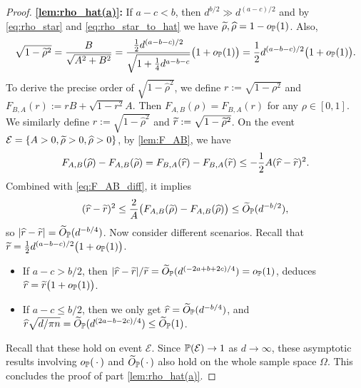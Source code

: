 \begin{proof}
\vspace{0.5\baselineskip}
\noindent
\textbf{\ref{lem:rho_hat(a)}:}
If $a - c < b$, then $d^{b/2} \gg d^{(a-c)/2}$ and by \cref{eq:rho_star} and \eqref{eq:rho_star_to_hat} we have $\wt\rho, \hat\rho = 1 - o_\P(1)$. Also,
\begin{equation*}
    \sqrt{1 - \wt\rho^2} = \frac{B}{\sqrt{A^2 + B^2}}
    = \frac{\frac12 d^{(a-b-c)/2}}{\sqrt{ 1 + \frac14 d^{a-b-c} }}\bigl(1 + o_{\P}(1)\bigr)
    = \frac12 d^{(a-b-c)/2}\bigl(1 + o_{\P}(1)\bigr).
\end{equation*}
To derive the precise order of $\sqrt{1 - \hat\rho^2}$, we define $r := \sqrt{1 - \rho^2}$ and $F_{B,A}(r) := rB + \sqrt{1 - r^2}A$. Then $F_{A,B}(\rho) = F_{B,A}(r)$ for any $\rho \in [0, 1]$. We similarly define $\hat r := \sqrt{1 - \hat\rho^2}$ and $\wt r := \sqrt{1 - \wt\rho^2}$. On the event $\mathcal{E} = \{ A > 0, \wt\rho >0, \hat\rho > 0 \}$, by \cref{lem:F_AB}, we have
\begin{equation*}
    F_{A,B}(\hat\rho) - F_{A,B}(\wt\rho) 
    = F_{B,A}(\hat r) - F_{B,A}(\wt r) 
    \le -\frac12 A (\hat r - \wt r)^2.
\end{equation*}
Combined with \cref{eq:F_AB_diff}, it implies
\begin{equation*}
    (\hat r - \wt r)^2 \le  \frac{2}{A}\bigl( F_{A,B}(\wt\rho) - F_{A,B}(\hat\rho) \bigr) \le \wt O_\P(d^{-b/2}),
\end{equation*}
so $|\hat r - \wt r| = \wt O_\P(d^{-b/4})$. Now consider different scenarios. Recall that $\wt r = \frac12 d^{(a-b-c)/2}\bigl(1 + o_{\P}(1)\bigr)$.
\begin{itemize}
    \item If $a - c > b/2$, then $|\hat r - \wt r|/\wt r = \wt O_\P(d^{(-2a + b + 2c)/4}) = o_\P(1)$, deduces $\hat r = \wt r \bigl(1 + o_{\P}(1)\bigr)$.
    \item If $a - c \le b/2$, then we only get $\hat r = \wt O_\P(d^{-b/4})$, and $\hat r \sqrt{d/\pi n} = \wt O_\P(d^{(2a - b-2c)/4})  \le \wt O_\P(1)$.
\end{itemize}
Recall that these hold on event $\mathcal{E}$. Since $\P(\mathcal{E}) \to 1$ as $d \to \infty$, these asymptotic results involving $o_\P(\,\cdot\,)$ and $\wt O_\P(\,\cdot\,)$ also hold on the whole sample space $\Omega$. This concludes the proof of part \ref{lem:rho_hat(a)}.




\end{proof}
